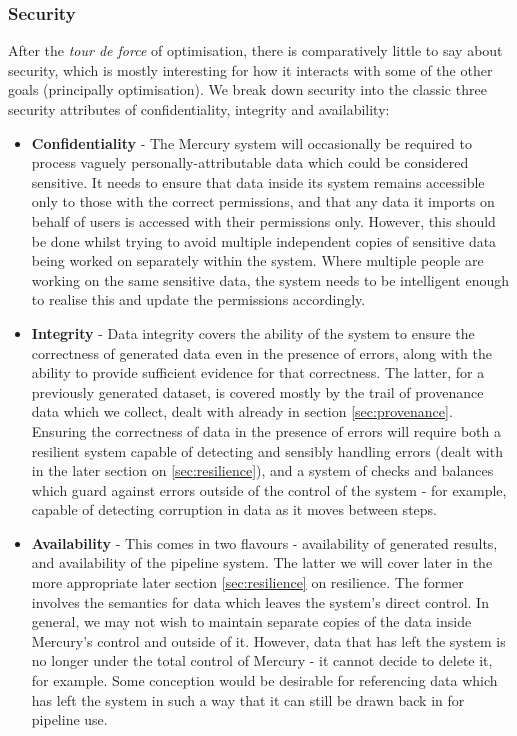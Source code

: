 \documentclass[10pt,a4paper]{article}
\newcommand{\npar}{\par\noindent\space}
\begin{document}
\subsubsection{Security}
\npar After the \textit{tour de force} of optimisation, there is comparatively little to say about security, which is mostly interesting for how it interacts with some of the other goals (principally optimisation). We break down security into the classic three security attributes of confidentiality, integrity and availability:
\begin{itemize}
\item \textbf{Confidentiality} - The Mercury system will occasionally be required to process vaguely personally-attributable data which could be considered sensitive. It needs to ensure that data inside its system remains accessible only to those with the correct permissions, and that any data it imports on behalf of users is accessed with their permissions only. However, this should be done whilst trying to avoid multiple independent copies of sensitive data being worked on separately within the system. Where multiple people are working on the same sensitive data, the system needs to be intelligent enough to realise this and update the permissions accordingly.
\item \textbf{Integrity} - Data integrity covers the ability of the system to ensure the correctness of generated data even in the presence of errors, along with the ability to provide sufficient evidence for that correctness. The latter, for a previously generated dataset, is covered mostly by the trail of provenance data which we collect, dealt with already in section \ref{sec:provenance}. Ensuring the correctness of data in the presence of errors will require both a resilient system capable of detecting and sensibly handling errors (dealt with in the later section on \ref{sec:resilience}), and a system of checks and balances which guard against errors outside of the control of the system - for example, capable of detecting corruption in data as it moves between steps.
\item \textbf{Availability} - This comes in two flavours - availability of generated results, and availability of the pipeline system. The latter we will cover later in the more appropriate later section \ref{sec:resilience} on resilience. The former involves the semantics for data which leaves the system's direct control. In general, we may not wish to maintain separate copies of the data inside Mercury's control and outside of it. However, data that has left the system is no longer under the total control of Mercury - it cannot decide to delete it, for example. Some conception would be desirable for referencing data which has left the system in such a way that it can still be drawn back in for pipeline use.
\end{itemize}
\end{document}
